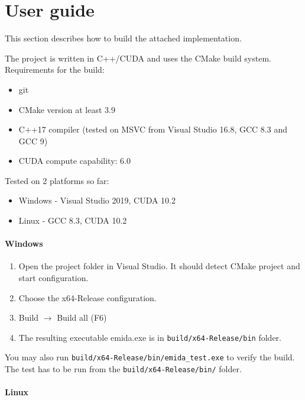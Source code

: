 \chapter{User guide}
This section describes how to build the attached implementation.


\vspace{0.3cm}
\noindent
The project is written in C++/CUDA and uses the CMake build system.  Requirements for the build:
\begin{itemize}
	\item git
	\item CMake version at least 3.9
	\item C++17 compiler (tested on MSVC from Visual Studio 16.8, GCC 8.3 and GCC 9)
	\item CUDA compute capability: 6.0
\end{itemize}
Tested on 2 platforms so far:
\begin{itemize}
	\item Windows - Visual Studio 2019, CUDA 10.2
	\item Linux - GCC 8.3, CUDA 10.2
\end{itemize}

\subsubsection*{Windows}

\begin{enumerate}
	\item Open the project folder in Visual Studio. It should detect CMake project and start configuration.
	\item Choose the x64-Release configuration.
	\item Build $\rightarrow$ Build all (F6)
	\item The resulting executable emida.exe is in \texttt{build/x64-Release/bin} folder.
\end{enumerate}
You may also run \texttt{build/x64-Release/bin/emida\_test.exe} to verify the build. The test has to be run from the \texttt{build/x64-Release/bin/} folder.

\subsubsection*{Linux}

